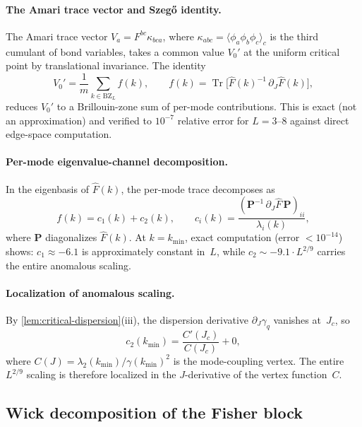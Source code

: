\documentclass[11pt]{article}
\theoremstyle{definition}
\theoremstyle{remark}
\newcommand{\Fish}{F}
\newcommand{\Jc}{J_c}
\newcommand{\BZ}{\mathrm{BZ}}
\newcommand{\Tr}{\operatorname{Tr}}
\begin{document}
\paragraph{The Amari trace vector and Szeg\H{o} identity.}
The Amari trace vector $V_a = \Fish^{bc}\kappa_{bca}$, where
$\kappa_{abc} = \langle\phi_a\phi_b\phi_c\rangle_c$ is the third
cumulant of bond variables, takes a common value $V_0'$ at the uniform
critical point by translational invariance.
The identity
\begin{equation}
  V_0' = \frac{1}{m}\sum_{k \in \BZ_L} f(k), \qquad
  f(k) = \Tr\bigl[\hat{\Fish}(k)^{-1}\,\partial_J \hat{\Fish}(k)\bigr],
  \label{eq:szego-identity}
\end{equation}
reduces $V_0'$ to a Brillouin-zone sum of per-mode contributions.
This is exact (not an approximation) and verified to $10^{-7}$ relative
error for $L = 3$--$8$ against direct edge-space computation.

\paragraph{Per-mode eigenvalue-channel decomposition.}
In the eigenbasis of $\hat{\Fish}(k)$, the per-mode trace
decomposes as
\begin{equation}
  f(k) = c_1(k) + c_2(k), \qquad
  c_i(k) = \frac{(\mathbf{P}^{-1}\,\partial_J\hat{\Fish}\,\mathbf{P})_{ii}}
  {\lambda_i(k)},
  \label{eq:channel-decomposition}
\end{equation}
where $\mathbf{P}$ diagonalizes $\hat{\Fish}(k)$.
At $k = k_{\min}$, exact computation (error $<10^{-14}$) shows:
$c_1 \approx -6.1$ is approximately constant in~$L$, while
$c_2 \sim -9.1 \cdot L^{2/9}$ carries the entire anomalous scaling.

\paragraph{Localization of anomalous scaling.}
By \cref{lem:critical-dispersion}(iii), the dispersion derivative
$\partial_J\gamma_q$ vanishes at~$\Jc$, so
\begin{equation}
  c_2(k_{\min}) = \frac{C'(\Jc)}{C(\Jc)} + 0,
  \label{eq:c2-vertex}
\end{equation}
where $C(J) = \lambda_2(k_{\min})/\gamma(k_{\min})^2$ is the
mode-coupling vertex.
The entire $L^{2/9}$ scaling is therefore localized in the
$J$-derivative of the vertex function~$C$.


\subsection{Wick decomposition of the Fisher block}
\label{subsec:wick}
\end{document}

